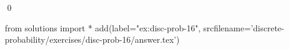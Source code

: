 
\begin{ex} 
  \label{ex:disc-prob-16}
  
  \qed
\end{ex} 
\begin{python0}
from solutions import *
add(label="ex:disc-prob-16",
    srcfilename='discrete-probability/exercises/disc-prob-16/answer.tex') 
\end{python0}
